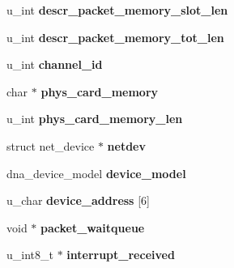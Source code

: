 \begin{DoxyCompactItemize}
\item 
\hypertarget{structdna__device_af134fa754cd5e111583d4c6bab57cb64}{
u\_\-int {\bfseries descr\_\-packet\_\-memory\_\-slot\_\-len}}
\label{structdna__device_af134fa754cd5e111583d4c6bab57cb64}

\item 
\hypertarget{structdna__device_a59421365094e70ea8884f8b0061ba851}{
u\_\-int {\bfseries descr\_\-packet\_\-memory\_\-tot\_\-len}}
\label{structdna__device_a59421365094e70ea8884f8b0061ba851}

\item 
\hypertarget{structdna__device_a13667d78b457cce8f4f6c5af4a4cf7d4}{
u\_\-int {\bfseries channel\_\-id}}
\label{structdna__device_a13667d78b457cce8f4f6c5af4a4cf7d4}

\item 
\hypertarget{structdna__device_a17f5b4c242ba4959c06199298cab16bc}{
char $\ast$ {\bfseries phys\_\-card\_\-memory}}
\label{structdna__device_a17f5b4c242ba4959c06199298cab16bc}

\item 
\hypertarget{structdna__device_af4974b20597fe5e768107e4953ff4360}{
u\_\-int {\bfseries phys\_\-card\_\-memory\_\-len}}
\label{structdna__device_af4974b20597fe5e768107e4953ff4360}

\item 
\hypertarget{structdna__device_a0e00069b227399f1c9cac7953d92ace5}{
struct net\_\-device $\ast$ {\bfseries netdev}}
\label{structdna__device_a0e00069b227399f1c9cac7953d92ace5}

\item 
\hypertarget{structdna__device_a0dd62be4a01b2d61b83b0e245a677e52}{
dna\_\-device\_\-model {\bfseries device\_\-model}}
\label{structdna__device_a0dd62be4a01b2d61b83b0e245a677e52}

\item 
\hypertarget{structdna__device_a832f3bb21b9941c277fed59389efb41d}{
u\_\-char {\bfseries device\_\-address} \mbox{[}6\mbox{]}}
\label{structdna__device_a832f3bb21b9941c277fed59389efb41d}

\item 
\hypertarget{structdna__device_a3eb0466152c9bd9aa743e868bcfa2d21}{
void $\ast$ {\bfseries packet\_\-waitqueue}}
\label{structdna__device_a3eb0466152c9bd9aa743e868bcfa2d21}

\item 
\hypertarget{structdna__device_a336eedaf65bbe69fcda2eac0fb7161e2}{
u\_\-int8\_\-t $\ast$ {\bfseries interrupt\_\-received}}
\label{structdna__device_a336eedaf65bbe69fcda2eac0fb7161e2}


\end{DoxyCompactItemize}
